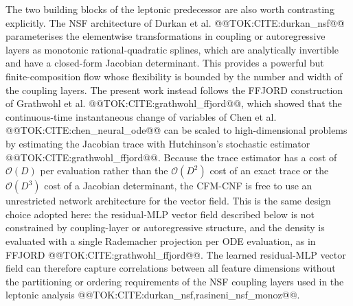 \documentclass[11pt]{article}
\begin{document}
The two building blocks of the leptonic predecessor are also worth
contrasting explicitly. The NSF architecture of Durkan et al.
@@TOK:CITE:durkan_nsf@@ parameterises the elementwise transformations in coupling
or autoregressive layers as monotonic rational-quadratic splines, which are
analytically invertible and have a closed-form Jacobian determinant. This
provides a powerful but finite-composition flow whose flexibility is
bounded by the number and width of the coupling layers. The present work
instead follows the FFJORD construction of Grathwohl et al.
@@TOK:CITE:grathwohl_ffjord@@, which showed that the continuous-time
instantaneous change of variables of Chen et al. @@TOK:CITE:chen_neural_ode@@
can be scaled to high-dimensional problems by estimating the Jacobian trace
with Hutchinson's stochastic estimator @@TOK:CITE:grathwohl_ffjord@@. Because the
trace estimator has a cost of $\mathcal{O}(D)$ per evaluation rather than
the $\mathcal{O}(D^2)$ cost of an exact trace or the $\mathcal{O}(D^3)$
cost of a Jacobian determinant, the CFM-CNF is free to use an unrestricted
network architecture for the vector field. This is the same design choice
adopted here: the residual-MLP vector field described below is not
constrained by coupling-layer or autoregressive structure, and the density
is evaluated with a single Rademacher projection per ODE evaluation, as in
FFJORD @@TOK:CITE:grathwohl_ffjord@@. The learned residual-MLP vector field can
therefore capture correlations between all feature dimensions without the
partitioning or ordering requirements of the NSF coupling layers used in
the leptonic analysis @@TOK:CITE:durkan_nsf,rasineni_nsf_monoz@@.
\end{document}
